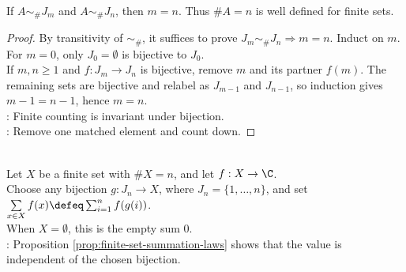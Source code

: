 \begin{proposition} \label{prop:finite-cardinality-well-defined} \\
If $A\sim_{\#}J_m$ and $A\sim_{\#}J_n$, then $m=n$. Thus $\#A=n$ is well defined for finite sets.
\begin{proof}
By transitivity of $\sim_{\#}$, it suffices to prove $J_m\sim_{\#}J_n\Rightarrow m=n$. Induct on $m$.\\
For $m=0$, only $J_0=\emptyset$ is bijective to $J_0$.\\
If $m,n\geq1$ and $f:J_m\to J_n$ is bijective, remove $m$ and its partner $f(m)$. The remaining sets are bijective and relabel as $J_{m-1}$ and $J_{n-1}$, so induction gives $m-1=n-1$, hence $m=n$.\\
: Finite counting is invariant under bijection.\\
: Remove one matched element and count down.
\end{proof}
\end{proposition}

\begin{definition} \label{def:finite-set-summation} \\
Let $X$ be a finite set with $\#X=n$, and let $f:X\to\C$.\\
Choose any bijection $g:J_n\to X$, where $J_n=\{1,\ldots,n\}$, and set $\sum\limits_{x\in X}f(x)\defeq\sum_{i=1}^{n}f(g(i))$.\\
When $X=\emptyset$, this is the empty sum $0$.\\
: Proposition \ref{prop:finite-set-summation-laws} shows that the value is independent of the chosen bijection.
\end{definition}

